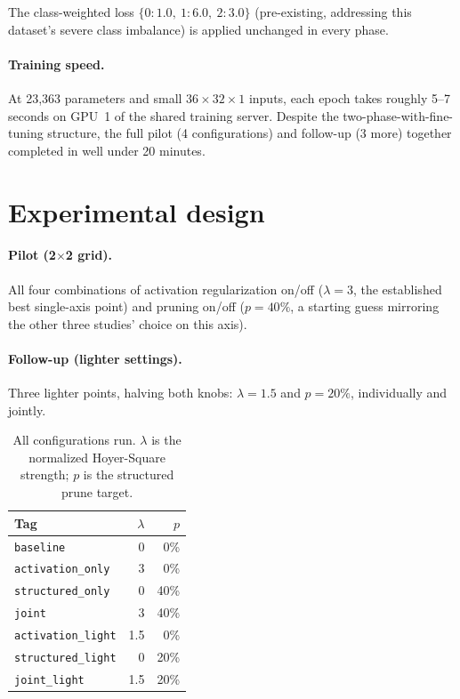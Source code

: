 \documentclass[11pt]{article}
\newcommand{\code}[1]{\texttt{#1}}
\begin{document}
The class-weighted loss $\{0{:}1.0,\ 1{:}6.0,\ 2{:}3.0\}$ (pre-existing, addressing this dataset's severe class imbalance) is applied unchanged in every phase.

\paragraph{Training speed.} At 23,363 parameters and small $36\times32\times1$ inputs, each epoch takes roughly 5--7 seconds on GPU~1 of the shared training server. Despite the two-phase-with-fine-tuning structure, the full pilot (4 configurations) and follow-up (3 more) together completed in well under 20 minutes.

\section{Experimental design}

\paragraph{Pilot (2$\times$2 grid).} All four combinations of activation regularization on/off ($\lambda=3$, the established best single-axis point) and pruning on/off ($p=40\%$, a starting guess mirroring the other three studies' choice on this axis).

\paragraph{Follow-up (lighter settings).} Three lighter points, halving both knobs: $\lambda=1.5$ and $p=20\%$, individually and jointly.

\begin{table}[H]
\centering
\caption{All configurations run. $\lambda$ is the normalized Hoyer-Square strength; $p$ is the structured prune target.}
\label{tab:configs}
\begin{tabular}{@{}lrr@{}}
\toprule
Tag & $\lambda$ & $p$ \\
\midrule
\code{baseline} & 0 & 0\% \\
\code{activation\_only} & 3 & 0\% \\
\code{structured\_only} & 0 & 40\% \\
\code{joint} & 3 & 40\% \\
\code{activation\_light} & 1.5 & 0\% \\
\code{structured\_light} & 0 & 20\% \\
\code{joint\_light} & 1.5 & 20\% \\
\bottomrule
\end{tabular}
\end{table}
\end{document}
